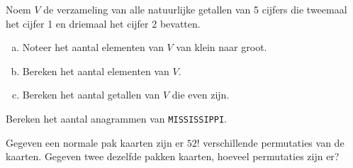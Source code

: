 \documentclass[12pt,twoside]{article}
\begin{document}
\begin{oefening}
Noem $V$ de verzameling van alle natuurlijke getallen van 5 cijfers die tweemaal het cijfer 1 en driemaal het cijfer 2 bevatten.
\begin{enumerate}[(a)]
  \item Noteer het aantal elementen van $V$ van klein naar groot.
  \item Bereken het aantal elementen van $V$.
  \item Bereken het aantal getallen van $V$ die even zijn.
\end{enumerate}
\end{oefening}

\begin{oefening}
Bereken het aantal anagrammen van \verb#MISSISSIPPI#.
\end{oefening}

\begin{oefening} %
Gegeven een normale pak kaarten zijn er $52!$ verschillende permutaties van de kaarten. Gegeven twee dezelfde pakken kaarten, hoeveel permutaties zijn er?
\end{oefening}

\end{document}
